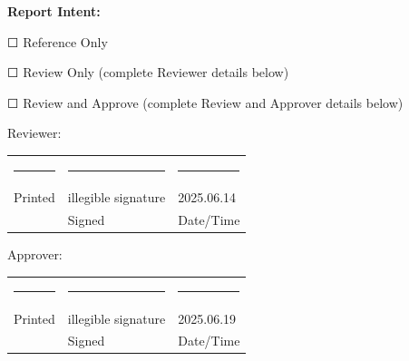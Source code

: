 \documentclass[UTF8,10pt,a4paper,fontset=fandol]{ctexart}
\newcommand{\fieldvalue}[1]{#1}
\newcommand{\handwritten}[1]{#1}
\newcommand{\checkboxfield}[1]{\ifstrequal{#1}{checked}{☑}{\ifstrequal{#1}{unclear}{?}{☐}}}
\begin{document}
\vspace{0.22in}

\textbf{Report Intent:}

\fieldvalue{\checkboxfield{unchecked}} Reference Only

\fieldvalue{\checkboxfield{unchecked}} Review Only (complete Reviewer details below)

\fieldvalue{\checkboxfield{unchecked}} Review and Approve (complete Review and Approver details below)

\vspace{0.08in}

Reviewer:

\vspace{0.05in}
\noindent
\begin{tabular}{p{1.35in} p{1.35in} p{1.35in}}
\centering\rule{1.25in}{0.4pt} &
\centering\rule{1.25in}{0.4pt} &
\centering\rule{1.25in}{0.4pt}
\\[-1pt]
Printed &
\fieldvalue{\handwritten{illegible signature}} &
\fieldvalue{\handwritten{2025.06.14}}
\\
&
Signed &
Date/Time
\end{tabular}

\vspace{0.12in}

Approver:

\vspace{0.05in}
\noindent
\begin{tabular}{p{1.35in} p{1.35in} p{1.35in}}
\centering\rule{1.25in}{0.4pt} &
\centering\rule{1.25in}{0.4pt} &
\centering\rule{1.25in}{0.4pt}
\\[-1pt]
Printed &
\fieldvalue{\handwritten{illegible signature}} &
\fieldvalue{\handwritten{2025.06.19}}
\\
&
Signed &
Date/Time
\end{tabular}
\end{document}
